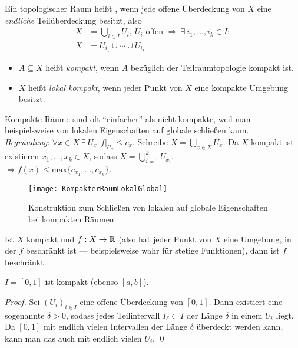 \begin{definition}\label{def:kompakt}
  Ein topologischer Raum heißt , wenn jede offene Überdeckung von \( X \) eine \emph{endliche} Teilüberdeckung besitzt, also
  \begin{align*}
    X &= \bigcup_{i \in I} U_i, \ U_i \text{ offen } \Rightarrow \ \exists \ i_1, \dots, i_k \in I : \\
    X &= U_{i_1} \cup \cdots \cup U_{i_k}
  \end{align*}
  \begin{itemize}
    \item \( A \subseteq X \) heißt \emph{kompakt}, wenn \( A \) bezüglich der Teilraumtopologie kompakt ist.
    \item \( X \) heißt \emph{lokal kompakt}, wenn jeder Punkt von \( X \) eine kompakte Umgebung besitzt.
  \end{itemize}
\end{definition}

\begin{remark}
  Kompakte Räume sind oft ``einfacher'' als nicht-kompakte, weil man beispielsweise von lokalen Eigenschaften auf globale schließen kann. \\
  \emph{Begründung}: \( \forall x \in X \ \exists \ U_x : f\vert_{U_x} \leq c_x \). Schreibe \( X = \bigcup_{x \in X}U_x \). Da \( X \) kompakt ist existieren \( x_1, \dots, x_k \in X \), sodass \( X = \bigcup_{i=1}^k U_{x_i} \). \\
  \( \Rightarrow f(x) \leq \text{max}\{ c_{x_1}, \dots, c_{x_k} \} \).
  \begin{figure}[H]
    \texttt{[image: KompakterRaumLokalGlobal]}
    \caption{Konstruktion zum Schließen von lokalen auf globale Eigenschaften bei kompakten Räumen}
  \end{figure}
\end{remark}

\begin{example}\label{bsp:beschraenkt}
  Ist \( X \) kompakt und \( f: X \to \mathbb{R} \)  (also hat jeder Punkt von \( X \) eine Umgebung, in der \( f \) beschränkt ist --- beispielsweise wahr für stetige Funktionen), dann ist \( f \) beschränkt.
\end{example}

\begin{example}
  \( I = [0,1] \) ist kompakt (ebenso \( [a,b] \)).
  \begin{proof}
    Sei \( {(U_i)}_{i \in I} \) eine offene Überdeckung von \( [0,1] \). Dann existiert eine sogenannte \label{def:lebesgueZahl} \( \delta > 0 \), sodass jedes Teilintervall \( I_\delta \subset I \) der Länge \( \delta \) in einem \( U_i \) liegt. Da \( [0,1] \) mit endlich vielen Intervallen der Länge \( \delta \) überdeckt werden kann, kann man das auch mit endlich vielen \( U_i \). \qed{}
  \end{proof}
\end{example}

